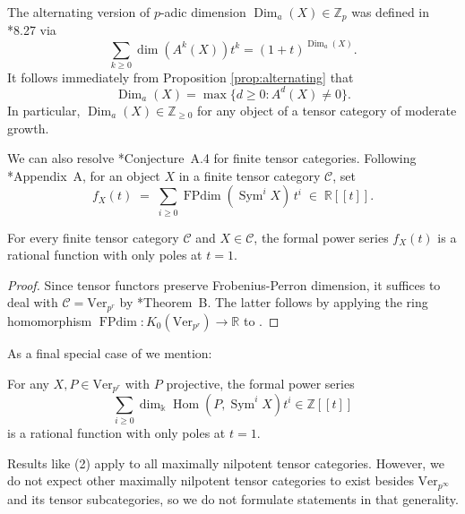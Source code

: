 \documentclass[11pt,oneside]{amsart}
\theoremstyle{definition}
\theoremstyle{remark}
\numberwithin{equation}{section}
\newcommand\cC{\mathcal C}
\newcommand\Ver{\mathrm{Ver}}
\newcommand\Dim{\operatorname{Dim}}
\newcommand\Sym{\operatorname{Sym}}
\renewcommand\:\colon
\newcommand\kk{\Bbbk}
\newcommand\Hom{\operatorname{Hom}}
\newcommand\FPdim{\operatorname{FPdim}}
\newcommand\ZZ{\mathbb Z}
\begin{document}
\begin{remark}
    The alternating version of $p$-adic dimension $\Dim_a(X)\in \ZZ_p$ was defined
    in \cite{CEO-frob}*{8.27} via
$$
\sum_{k\ge0} \dim(A^k(X)) t^k = (1+t)^{\Dim_a(X)}.
$$
It follows immediately from Proposition \ref{prop:alternating}
that 
$$
\Dim_a(X)=\max\{d\ge0: A^d(X)\neq0\}.
$$
In particular, $\Dim_a(X)\in \ZZ_{\ge0}$ for any object of a tensor category of moderate growth.
\end{remark}



We can also resolve \cite{EO-Frob}*{Conjecture~A.4} for finite tensor categories. Following \cite{EO-Frob}*{Appendix~A}, for an object $X$ in a finite tensor category $\cC$, set
\[f_X(t)\;=\;\sum_{i\ge 0} \FPdim(\Sym^i X) \,t^i\;\in\;\mathbb{R}[[t]].\]

\begin{proposition}For every finite tensor category $\cC$ and $X\in\cC$, the formal power series $f_X(t)$ is a rational function with only poles at $t=1$.
\end{proposition}
\begin{proof}
Since tensor functors preserve Frobenius-Perron dimension, it suffices to deal with $\cC=\Ver_{p^r}$ by \cite{CF-beo}*{Theorem~B}.
    The latter follows by applying the ring homomorphism $\FPdim: K_0(\Ver_{p^r})\to\mathbb{R}$ to .
\end{proof}


As a final special case of  we mention:
\begin{lemma}
    For any $X,P\in\Ver_{p^r}$ with $P$ projective, the formal power series \[\sum_{i\ge 0} \dim_\kk\Hom(P,\Sym^i X) t^i\in\mathbb{Z}[[t]]\] is a rational function with only poles at $t=1$. 
\end{lemma}

\begin{remark}
    Results like (2) apply to all maximally nilpotent tensor categories. However, we do not expect other maximally nilpotent tensor categories to exist besides $\Ver_{p^{\infty}}$ and its tensor subcategories, so we do not formulate statements in that generality.
\end{remark}


{}

\end{document}
